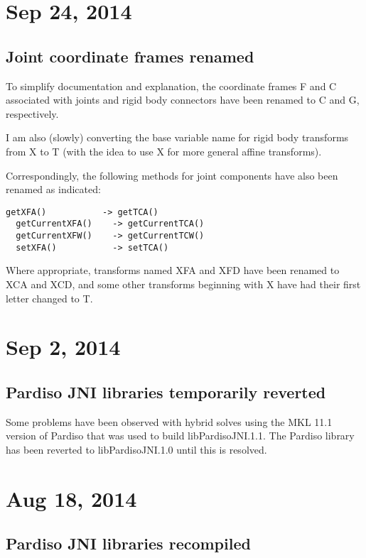 \documentclass{article}
\begin{document}
\section*{Sep 24, 2014}

\subsection*{Joint coordinate frames renamed}

To simplify documentation and explanation, the coordinate frames F and
C associated with joints and rigid body connectors have been renamed
to C and G, respectively.

I am also (slowly) converting the base variable name for rigid body
transforms from X to T (with the idea to use X for more general affine
transforms).

Correspondingly, the following methods for joint components have also
been renamed as indicated:
%
\begin{lstlisting}[]
  getXFA()           -> getTCA()
  getCurrentXFA()    -> getCurrentTCA()
  getCurrentXFW()    -> getCurrentTCW()
  setXFA()           -> setTCA()
\end{lstlisting}
%
Where appropriate, transforms named XFA and XFD have been renamed to
XCA and XCD, and some other transforms beginning with X have had their
first letter changed to T.

\section*{Sep 2, 2014}

\subsection*{Pardiso JNI libraries temporarily reverted}

Some problems have been observed with hybrid solves using the MKL 11.1
version of Pardiso that was used to build libPardisoJNI.1.1.  The
Pardiso library has been reverted to libPardisoJNI.1.0 until this is
resolved.

\section*{Aug 18, 2014}

\subsection*{Pardiso JNI libraries recompiled}
\end{document}
